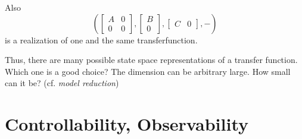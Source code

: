\documentclass[a4paper,10pt]{article}
\begin{document}
Also
\begin{equation*}
	(
	\begin{bmatrix} A & 0 \\ 0 & 0 \end{bmatrix},
	\begin{bmatrix} B \\ 0 \end{bmatrix},
	\begin{bmatrix} C & 0 \end{bmatrix}, -
	)
\end{equation*}
is a realization of one and the same transferfunction.

Thus, there are many possible state space representations of a transfer function. Which one is a good choice? The dimension can be arbitrary large. How small can it be? (cf. \emph{model reduction})

\section{Controllability, Observability}



\end{document}
